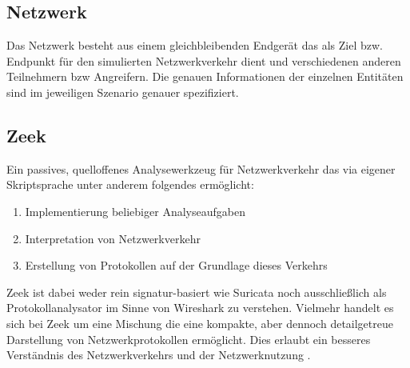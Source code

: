 \subsection{Netzwerk}
Das Netzwerk besteht aus einem gleichbleibenden Endgerät das als Ziel bzw. Endpunkt für den simulierten Netzwerkverkehr dient und verschiedenen anderen Teilnehmern bzw Angreifern. Die genauen Informationen der einzelnen Entitäten sind im jeweiligen Szenario genauer spezifiziert.
\subsection{Zeek}
Ein passives, quelloffenes Analysewerkzeug für Netzwerkverkehr das via eigener  Skriptsprache unter anderem folgendes ermöglicht:
\begin{enumerate}
\item{Implementierung beliebiger Analyseaufgaben}
\item{Interpretation von Netzwerkverkehr}
\item{Erstellung von Protokollen auf der Grundlage dieses Verkehrs}
\end{enumerate}
Zeek ist dabei weder rein signatur-basiert wie Suricata noch ausschließlich als Protokollanalysator im Sinne von Wireshark zu verstehen. Vielmehr handelt es sich bei Zeek um eine Mischung die eine kompakte, aber dennoch detailgetreue Darstellung von Netzwerkprotokollen ermöglicht. Dies erlaubt ein besseres Verständnis des Netzwerkverkehrs und der Netzwerknutzung \cite{zeek_about_page}.

